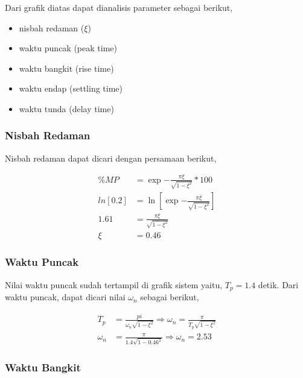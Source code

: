 \documentclass[../laporan]{subfiles}
\begin{document}
Dari grafik diatas dapat dianalisis parameter sebagai berikut,

\begin{itemize}
    \item nisbah redaman ($\xi$)
    \item waktu puncak (peak time)
    \item waktu bangkit (rise time)
    \item waktu endap (settling time)
    \item waktu tunda (delay time)
\end{itemize}

\subsubsection{Nisbah Redaman}

Nisbah redaman dapat dicari dengan persamaan berikut,

\begin{equation}
    \begin{split}
        \%MP &= \exp{-\frac{\pi\xi}{\sqrt{1 - \xi^2}}}*100 \\[5pt]
        ln{[0.2]} &= \ln{[\exp{-\frac{\pi\xi}{\sqrt{1 - \xi^2}}}]} \\[5pt]
        1.61 &= \frac{\pi\xi}{\sqrt{1-\xi^2}} \\[5pt]
        \xi &= 0.46
    \end{split}
\end{equation}

\subsubsection{Waktu Puncak}

Nilai waktu puncak sudah tertampil di grafik sistem yaitu, $T_p = 1.4$ detik.
Dari waktu puncak, dapat dicari nilai $\omega_n$ sebagai berikut,

\begin{equation}
    \begin{split}
        T_p &= \frac{pi}{\omega_n\sqrt{1-\xi^2}} \Rightarrow \omega_n = \frac{\pi}{T_p\sqrt{1-\xi^2}} \\[5pt]
        \omega_n &= \frac{\pi}{1.4\sqrt{1-0.46^2}} \Rightarrow \omega_n = 2.53
    \end{split}
\end{equation}

\subsubsection{Waktu Bangkit}
\end{document}
